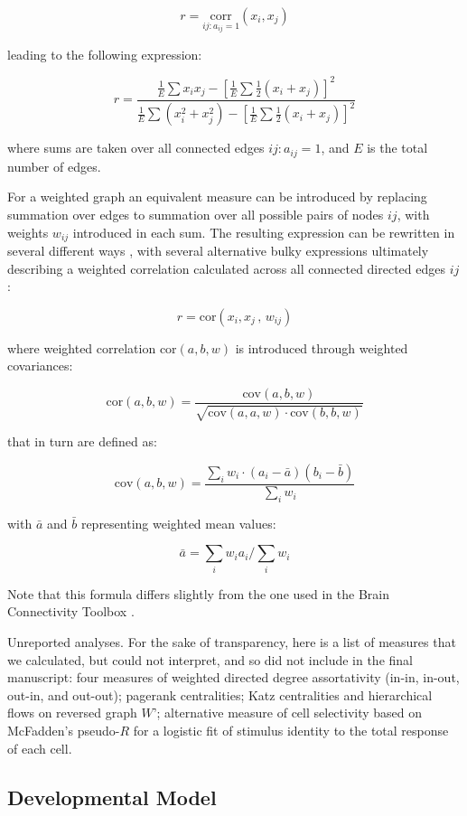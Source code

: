 \documentclass{article}
\begin{document}
$$r=\underset{ij: a_{ij}=1}{\text{corr}}(x_i,x_j)$$

leading to the following expression:

$$r = \frac{\frac{1}{E} \sum{x_i x_j} - [\frac{1}{E} \sum{\frac{1}{2}(x_i+x_j)}]^2} {\frac{1}{E} \sum{(x_i^2+x_j^2)}-[\frac{1}{E} \sum{\frac{1}{2}(x_i+x_j)}]^2}$$

where sums are taken over all connected edges $ij: a_{ij}=1$, and $E$ is the total number of edges.

For a weighted graph an equivalent measure can be introduced by replacing summation over edges to summation over all possible pairs of nodes $ij$, with weights $w_{ij}$ introduced in each sum. The resulting expression can be rewritten in several different ways \citep{newman2003mixing,leung2007weighted,farine2014weighted,teller2014assortative}, with several alternative bulky expressions ultimately describing a weighted correlation calculated across all connected directed edges $ij$:

$$r=\text{cor}(x_i,x_j \, , \, w_{ij})$$

where weighted correlation $\text{cor}(a,b,w)$ is introduced through weighted covariances: 

$$\text{cor}(a,b,w) = \frac{\text{cov}(a,b,w)}{\sqrt{\text{cov}(a,a,w) \cdot \text{cov}(b,b,w)}}$$

that in turn are defined as: 

$$\text{cov}(a,b,w) = \frac{\sum_i{w_i \cdot (a_i-\bar{a})(b_i-\bar{b})}}{\sum_i{w_i}}$$

with $\bar{a}$ and $\bar{b}$ representing weighted mean values: 

$$\bar{a}=\sum_i{w_i a_i}/\sum_i{w_i}$$

Note that this formula differs slightly from the one used in the Brain Connectivity Toolbox \citep{rubinov2010toolbox}.

Unreported analyses. For the sake of transparency, here is a list of measures that we calculated, but could not interpret, and so did not include in the final manuscript: four measures of weighted directed degree assortativity (in-in, in-out, out-in, and out-out); pagerank centralities; Katz centralities and hierarchical flows on reversed graph $W’$; alternative measure of cell selectivity based on McFadden’s pseudo-$R$ for a logistic fit of stimulus identity to the total response of each cell.

\subsection*{Developmental Model}
\end{document}
